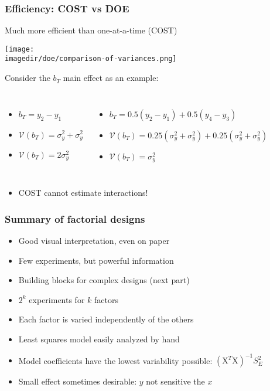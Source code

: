 \begin{frame}\frametitle{Efficiency: COST vs DOE}
	\begin{block}{Much more efficient than one-at-a-time (COST)}
		\begin{center}
			\texttt{[image: \\imagedir/doe/comparison-of-variances.png]}
		\end{center}
	\end{block}
	Consider the $b_T$ main effect as an example:
	\begin{columns}
		\column{3.5cm}
			\begin{itemize}
				\item	$b_T = y_2 - y_1$
				\item	$\mathcal{V}(b_T) = \sigma_y^2 + \sigma_y^2$
				\item	$\mathcal{V}(b_T) = 2\sigma_y^2$
			\end{itemize}
		\column{7cm}
			\begin{itemize}
				\item	$b_T = 0.5(y_2 - y_1) + 0.5(y_4 - y_3)$
				\item	$\mathcal{V}(b_T) = 0.25(\sigma_y^2 + \sigma_y^2) + 0.25(\sigma_y^2 + \sigma_y^2)$
				\item	$\mathcal{V}(b_T) = \sigma_y^2$
			\end{itemize}
	\end{columns}
	\begin{itemize}
		\item	COST cannot estimate interactions!
	\end{itemize}
\end{frame}

\begin{frame}\frametitle{Summary of factorial designs}
	\begin{itemize}
		\item	Good visual interpretation, even on paper
		\item	Few experiments, but powerful information
		\item	Building blocks for complex designs (next part)
		\item	$2^k$ experiments for $k$ factors
		\item	Each factor is varied independently of the others
		\item	Least squares model easily analyzed by hand
		\item	Model coefficients have the lowest variability possible: $(\mathrm{X}^T\mathrm{X})^{-1}S_E^2$
		\item	Small effect sometimes desirable: $y$ not sensitive the $x$
	\end{itemize}
\end{frame}

